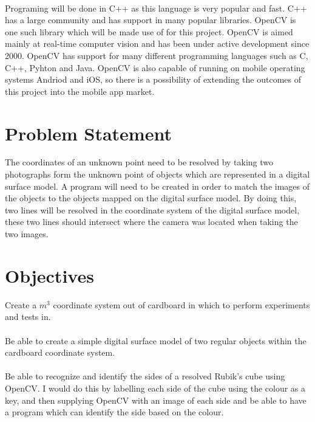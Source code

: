 \documentclass{article}
\begin{document}
\paragraph{}
Programing will be done in C++ as this language is very popular and fast. C++ has a large community and has support in many popular libraries. OpenCV is one such library which will be made use of for this project. OpenCV is aimed mainly at real-time computer vision and has been under active development since 2000. OpenCV has support for many different programming languages such as C, C++, Pyhton and Java. OpenCV is also capable of running on mobile operating systems Andriod and iOS, so there is a possibility of extending the outcomes of this project into the mobile app market.

\section{Problem Statement}
The coordinates of an unknown point need to be resolved by taking two photographs form the unknown point of objects which are represented in a digital surface model. A program will need to be created in order to match the images of the objects to the objects mapped on the digital surface model. By doing this, two lines will be resolved in the coordinate system of the digital surface model, these two lines should intersect where the camera was located when taking the two images.

\section{Objectives}

Create a $m^3$ coordinate system out of cardboard in which to perform experiments and tests in.

\paragraph{}
Be able to create a simple digital surface model of two regular objects within the cardboard coordinate system.

\paragraph{}
Be able to recognize and identify the sides of a resolved Rubik's cube using OpenCV. I would do this by labelling each side of the cube using the colour as a key, and then supplying OpenCV with an image of each side and be able to have a program which can identify the side based on the colour.
\end{document}
